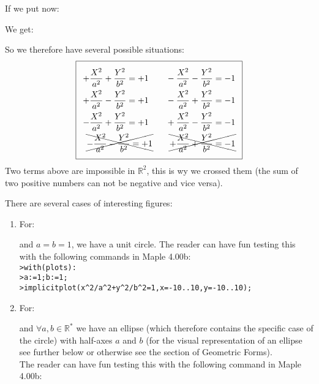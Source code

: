 \begin{enumerate}
\begin{itemize}
			If we put now:
			
			We get:
			
			So we therefore have several possible situations:
			\begin{equation}
			  \addtolength{\fboxsep}{5pt}
			   \boxed{
			   \begin{gathered}
				\begin{aligned}
				+\dfrac{X^2}{a^2}+\dfrac{Y^2}{b^2}=+1 \qquad -\dfrac{X^2}{a^2}-\dfrac{Y^2}{b^2}=-1\\
				+\dfrac{X^2}{a^2}-\dfrac{Y^2}{b^2}=+1 \qquad -\dfrac{X^2}{a^2}+\dfrac{Y^2}{b^2}=-1\\
				-\dfrac{X^2}{a^2}+\dfrac{Y^2}{b^2}=+1 \qquad +\dfrac{X^2}{a^2}-\dfrac{Y^2}{b^2}=-1\\
				\xcancel{-\dfrac{X^2}{a^2}-\dfrac{Y^2}{b^2}=+1} \qquad \xcancel{+\dfrac{X^2}{a^2}+\dfrac{Y^2}{b^2}=-1}\\
				\end{aligned}
			   \end{gathered}
			   }
			\end{equation}
			Two terms above are impossible in $\mathbb{R}^2$, this is wy we crossed them (the sum of two positive numbers can not be negative and vice versa).
			
			There are several cases of interesting figures:			
			\begin{enumerate}
				\item For\label{equation of a circle}:
					
				and $a=b=1$, we have a unit circle. The reader can have fun testing this with the following commands in Maple 4.00b:\\
				
				\texttt{>with(plots):}\\
				\texttt{>a:=1;b:=1;}\\
				\texttt{>implicitplot(x\string^2/a\string^2+y\string^2/b\string^2=1,x=-10..10,y=-10..10);}
				
				\item For:
					
				and $\forall a,b \in \mathbb{R}^{*}$ we have an ellipse\label{analytical expression ellipse} (which therefore contains the specific case of the circle) with half-axes $a$ and $b$ (for the visual representation of an ellipse see further below or otherwise see the section of Geometric Forms).\\
				
				The reader can have fun testing this with the following command in Maple 4.00b:\\
				

\end{enumerate}
\end{itemize}
\end{enumerate}
